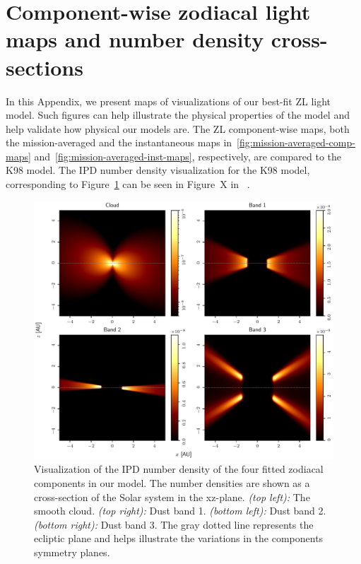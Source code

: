 \documentclass[twocolumn]{aa}
\begin{document}
%



%

\appendix
\onecolumn

\section{Component-wise zodiacal light maps and number density cross-sections}
\label{sec:zodi-comps}

In this Appendix, we present maps of visualizations of our best-fit ZL 
light model. Such figures can help illustrate the physical properties 
of the model and help validate how physical our models are. The ZL 
component-wise maps, both the mission-averaged and the instantaneous maps 
in~\ref{fig:mission-averaged-comp-maps} 
and~\ref{fig:mission-averaged-inst-maps}, respectively, are compared to 
the K98 model. The IPD number density visualization for the K98 model, 
corresponding to Figure~\ref{fig:ipd-number-density} can be seen in 
Figure~X in~\cite{San2022} .



\begin{figure}
    \centering
    \includegraphics[width=\textwidth]{figs/number_density.pdf}
    \caption{Visualization of the IPD number density of the four fitted zodiacal components in our model. The number densities are shown as a cross-section of the Solar system in the xz-plane. \textit{(top left):} The smooth cloud. \textit{(top right):} Dust band 1. \textit{(bottom left):} Dust band 2. \textit{(bottom right):} Dust band 3. The gray dotted line represents the ecliptic plane and helps illustrate the variations in the components symmetry planes.}
    \label{fig:ipd-number-density}
\end{figure}
\end{document}
